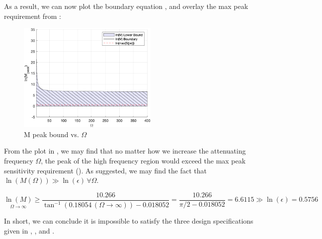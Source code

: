 \documentclass{tron}
\begin{document}
As a result, we can now plot the boundary equation , and overlay the max peak requirement from :
\begin{figure}[H]
	\centering
	\includegraphics[height=200px]{../matlab/output/p4/M-bound}
	\caption{M peak bound vs. $\Omega$}
	\label{fig:2rod:m-peak}
\end{figure}

From the plot in , we may find that no matter how we increase the attenuating frequency $\Omega$, the peak of the high frequency region would exceed the max peak sensitivity requirement (). As  suggested, we may find the fact that $\ln(M(\Omega))\gg \ln(\epsilon)\, \forall \Omega$. 

\begin{equation}
\underset{\Omega \rightarrow \infty}{\ln(M)}  \geq \frac{10.266}{\tan^{-1}\left(0.18054\,(\Omega\rightarrow \infty) \right)-0.018052} = \frac{10.266}{ \pi / 2 - 0.018052} = 6.6115 \gg \ln(\epsilon) = 0.5756 \label{eqn:M-bound-infinity}
\end{equation}

In short, we can conclude it is impossible to satisfy the three design specifications given in , , and .


\clearpage
\printglossaries
\end{document}
